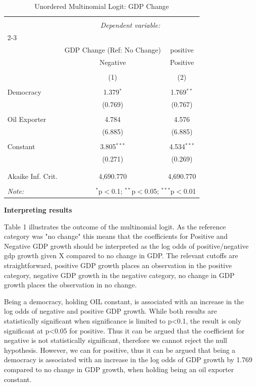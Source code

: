 \documentclass[12pt,letterpaper]{article}
\begin{document}
	
	\begin{table}[!htbp] \centering 
		\caption{Unordered Multinomial Logit: GDP Change} 
		\label{} 
		\begin{tabular}{@{\extracolsep{5pt}}lcc} 
			\\[-1.8ex]\hline 
			\hline \\[-1.8ex] 
			& \multicolumn{2}{c}{\textit{Dependent variable:}} \\ 
			\cline{2-3} 
			\\[-1.8ex] & GDP Change (Ref: No Change) & positive \\ 
			& Negative & Positive \\ 
			\\[-1.8ex] & (1) & (2)\\ 
			\hline \\[-1.8ex] 
			Democracy & 1.379$^{*}$ & 1.769$^{**}$ \\ 
			& (0.769) & (0.767) \\ 
			& & \\ 
			Oil Exporter & 4.784 & 4.576 \\ 
			& (6.885) & (6.885) \\ 
			& & \\ 
			Constant & 3.805$^{***}$ & 4.534$^{***}$ \\ 
			& (0.271) & (0.269) \\ 
			& & \\ 
			\hline \\[-1.8ex] 
			Akaike Inf. Crit. & 4,690.770 & 4,690.770 \\ 
			\hline 
			\hline \\[-1.8ex] 
			\textit{Note:}  & \multicolumn{2}{r}{$^{*}$p$<$0.1; $^{**}$p$<$0.05; $^{***}$p$<$0.01} \\ 
		\end{tabular} 
	\end{table} 
	\vspace{.25cm}
	\textbf{Interpreting results}
	
	Table 1 illustrates the outcome of the multinomial logit. As the reference category was "no change" this means that the coefficients for Positive and Negative GDP growth should be interpreted as the log odds of positive/negative gdp growth given X compared to no change in GDP. The relevant cutoffs are straightforward, positive GDP growth places an observation in the positive category, negative GDP growth in the negative category, no change in GDP growth places the observation in no change. 
	
	Being a democracy, holding OIL constant, is associated with an increase in the log odds of negative and positive GDP growth. While both results are statistically significant when significance is limited to p<0.1, the result is only significant at p<0.05 for positive. Thus it can be argued that the coefficient for negative is not statistically significant, therefore we cannot reject the null hypothesis. However, we can for positive, thus it can be argued that being a democracy is associated with an increase in the log odds of GDP growth by 1.769 compared to no change in GDP growth, when holding being an oil exporter constant.
	
\end{document}
